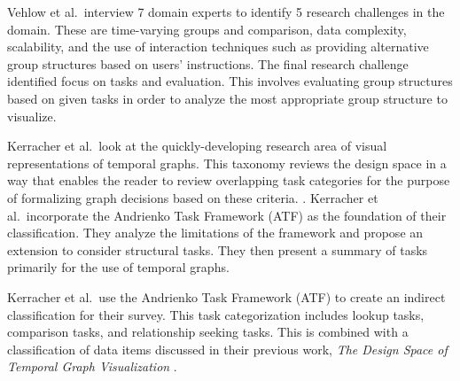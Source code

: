 Vehlow et al.\ interview 7 domain experts to identify 5 research challenges in the domain. These are time-varying groups and comparison, data complexity, scalability, and the use of interaction techniques such as providing alternative group structures based on users' instructions. The final research challenge identified focus on tasks and evaluation. This involves evaluating group structures based on given tasks in order to analyze the most appropriate group structure to visualize.

Kerracher et al.\ look at the quickly-developing research area of visual representations of temporal graphs. This taxonomy reviews the design space  in a way that enables the reader to review overlapping task categories for the purpose of formalizing graph decisions based on these criteria. \cite{kerracher2015task, kerracher2015visual}.
Kerracher et al.\ incorporate the Andrienko Task Framework (ATF) \cite{andrienko2006exploratory}  as the foundation of their classification. They analyze the limitations of the framework and propose an extension to consider structural tasks. They then present a summary of tasks primarily for the use of temporal graphs.


Kerracher et al.\ use the Andrienko Task Framework (ATF) \cite{andrienko2006exploratory} to create an indirect classification for their survey. This  task categorization includes lookup tasks, comparison tasks, and relationship seeking tasks. This is combined with a classification of data items discussed in their previous work, \textit{The Design Space of Temporal Graph Visualization} \cite{kerracher2014design}.


